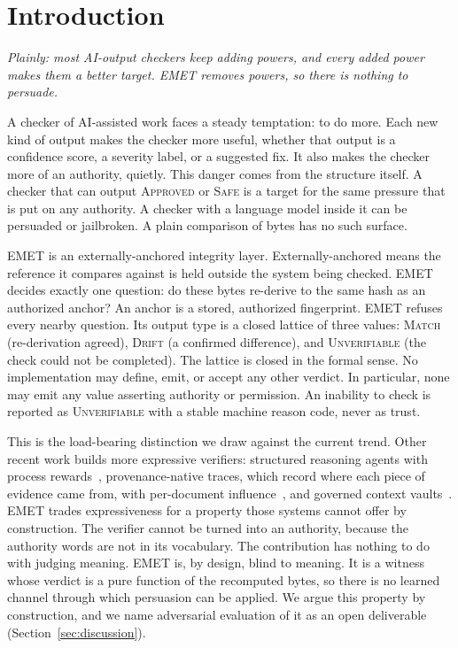 \documentclass[11pt]{article}
\begin{document}
\section{Introduction}
\emph{Plainly: most AI-output checkers keep adding powers, and every added power makes them a better target. EMET removes powers, so there is nothing to persuade.}

A checker of AI-assisted work faces a steady temptation: to do more. Each new kind of output makes the checker more useful, whether that output is a confidence score, a severity label, or a suggested fix. It also makes the checker more of an authority, quietly. This danger comes from the structure itself. A checker that can output \textsc{Approved} or \textsc{Safe} is a target for the same pressure that is put on any authority. A checker with a language model inside it can be persuaded or jailbroken. A plain comparison of bytes has no such surface.

EMET is an externally-anchored integrity layer. Externally-anchored means the reference it compares against is held outside the system being checked. EMET decides exactly one question: do these bytes re-derive to the same hash as an authorized anchor? An anchor is a stored, authorized fingerprint. EMET refuses every nearby question. Its output type is a closed lattice of three values: \textsc{Match} (re-derivation agreed), \textsc{Drift} (a confirmed difference), and \textsc{Unverifiable} (the check could not be completed). The lattice is closed in the formal sense. No implementation may define, emit, or accept any other verdict. In particular, none may emit any value asserting authority or permission. An inability to check is reported as \textsc{Unverifiable} with a stable machine reason code, never as trust.

This is the load-bearing distinction we draw against the current trend. Other recent work builds more expressive verifiers: structured reasoning agents with process rewards~\cite{seva}, provenance-native traces, which record where each piece of evidence came from, with per-document influence~\cite{provenai}, and governed context vaults~\cite{contextnest}. EMET trades expressiveness for a property those systems cannot offer by construction. The verifier cannot be turned into an authority, because the authority words are not in its vocabulary. The contribution has nothing to do with judging meaning. EMET is, by design, blind to meaning. It is a witness whose verdict is a pure function of the recomputed bytes, so there is no learned channel through which persuasion can be applied. We argue this property by construction, and we name adversarial evaluation of it as an open deliverable (Section~\ref{sec:discussion}).
\end{document}
